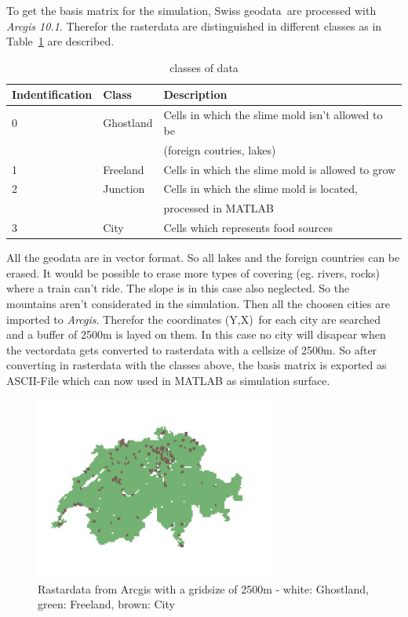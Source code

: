 \documentclass[11pt]{scrartcl}
\begin{document}
To get the basis matrix for the simulation, Swiss geodata\,\cite{gis_data} are processed with \textit{Arcgis 10.1}. Therefor the rasterdata are distinguished in different classes as in Table\, \ref{tab:class} are described.

\begin{table}[H]
	\centering
	\caption{classes of data}
		\begin{tabular}{lll}
		\toprule
		Indentification & Class & Description \\
		\midrule
		0 & Ghostland & Cells in which the slime mold isn't allowed to be\\
		& 		& (foreign coutries, lakes)\\
		1 & Freeland & Cells in which the slime mold is allowed to grow\\
		2 & Junction & Cells in which the slime mold is located, \\
		& & processed in MATLAB\\
		3 & City & Cells which represents food sources\\
		\bottomrule
	\end{tabular}
\label{tab:class}
\end{table}

All the geodata are in vector format. So all lakes and the foreign countries can be erased. It would be possible to erase more types of covering (eg. rivers, rocks) where a train can't ride. The slope is in this case also neglected. So the mountains aren't considerated in the simulation. Then all the choosen cities are imported to \textit{Arcgis}. Therefor the coordinates (Y,X)\,\cite{coordinates} for each city are searched and a buffer of 2500m is layed on them. In this case no city will disapear when the vectordata gets converted to rasterdata with a cellsize of 2500m. So after converting in rasterdata with the classes above, the basis matrix is exported as ASCII-File which can now used in MATLAB as simulation surface.



\begin{figure}[H]
	\centering
	\includegraphics[width=0.7\textwidth]{figures/map_2500_cities}
	\caption{Rastardata from Arcgis with a gridsize of 2500m - white: Ghostland, green: Freeland, brown: City}
	\label{fig:map_cities}
\end{figure}
\end{document}
